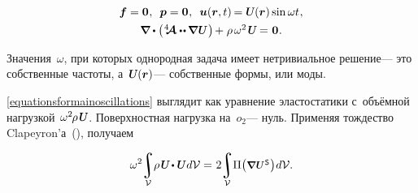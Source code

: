 \begin{otherlanguage}{russian}
\nopagebreak\vspace{-0.25em}\begin{equation}\label{equationsformainoscillations}
\begin{array}{c}
\bm{f} = \bm{0} \hspace{.1ex} ,
\:\;
\bm{p} = \bm{0} \hspace{.1ex} ,
\:\;
\bm{u}(\bm{r}, t) \hspace{-0.2ex} = \mathboldU(\bm{r}) \operatorname{sin} \omega t \hspace{.1ex} ,
\\[.4em]
%
\boldnabla \dotp \left( \hspace{.1ex} \stiffnesstensor \dotdotp \hspace{-0.12ex} \boldnabla \hspace{.1ex} \mathboldU \hspace{.2ex} \right) \hspace{-0.2ex}
+ \hspace{.1ex} \rho \hspace{.3ex} \omega^2 \hspace{.25ex} \mathboldU \hspace{-0.1ex}
= \hspace{.1ex} \bm{0} \hspace{.1ex} .
\end{array}
\end{equation}

\vspace{-0.15em} \noindent Значения~$\omega$, при которых однородная задача имеет нетривиальное решение\:--- это собственные частоты, а~${\mathboldU(\bm{r})}$\:--- собственные формы, или моды.

\eqref{equationsformainoscillations} выглядит как уравнение эластостатики с~объёмной нагрузкой~${\omega^2 \hspace{-0.2ex} \rho \hspace{.25ex} \mathboldU \hspace{-0.1ex}}$. Поверхностная нагрузка на~${o_2}$\:--- нуль. Применяя тождество Clapeyron’а~(), получаем

\nopagebreak\vspace{-0.2em}\begin{equation}
\omega^2 \hspace{-0.2em}
\integral\displaylimits_{\mathcal{V}} \hspace{-0.5ex}
\rho \hspace{.25ex} \mathboldU \hspace{-0.2ex} \dotp \mathboldU
\hspace{.1ex} d\mathcal{V}
= \hspace{.1ex}
2 \hspace{-0.2em}
\integral\displaylimits_{\mathcal{V}} \hspace{-0.5ex}
\Pi \bigl( \scalebox{0.9}{$\boldnabla \hspace{.1ex} \mathboldU \hspace{.2ex}^{\mathsf{S}}$} \hspace{.1ex} \bigr) \hspace{.1ex} d\mathcal{V} .
\end{equation}


\end{otherlanguage}
